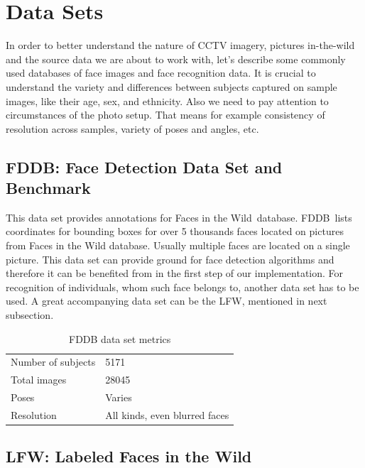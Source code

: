 \section{Data Sets}

In order to better understand the nature of CCTV imagery, pictures in-the-wild and the source data we are about to work with, let's describe some commonly used databases of face images and face recognition data. It is crucial to understand the variety and differences between subjects captured on sample images, like their age, sex, and ethnicity. Also we need to pay attention to circumstances of the photo setup. That means for example consistency of resolution across samples, variety of poses and angles, etc.

\subsection{FDDB: Face Detection Data Set and Benchmark}

This data set provides annotations for Faces in the Wild\,\cite{fiw} database. FDDB\,\cite{fddb} lists coordinates for bounding boxes for over 5 thousands faces located on pictures from Faces in the Wild database. Usually multiple faces are located on a single picture. This data set can provide ground for face detection algorithms and therefore it can be benefited from in the first step of our implementation. For recognition of individuals, whom such face belongs to, another data set has to be used. A great accompanying data set can be the LFW, mentioned in next subsection.

\begin{table}[ht]
    \centering
    \begin{tabularx}{.8\textwidth}{l|X}
        \toprule
        Number of subjects & \num{5171} \\
        Total images &  \num{28045} \\
        Poses & Varies \\
        Resolution & All kinds, even blurred faces \\
        \bottomrule
    \end{tabularx}
    \caption{FDDB data set metrics}
\end{table}

\subsection{LFW: Labeled Faces in the Wild}

